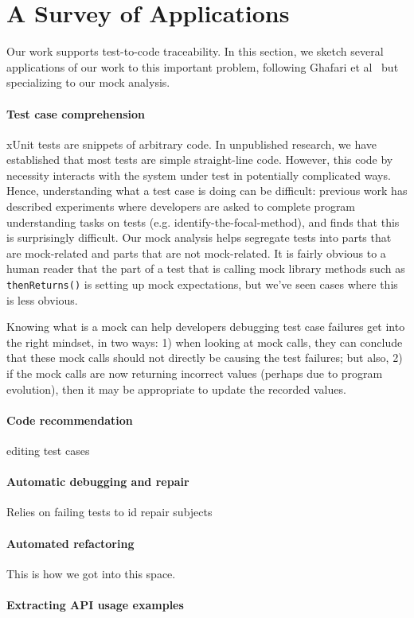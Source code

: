 \section{A Survey of Applications}
\label{sec:applications}

Our work supports test-to-code traceability. In this section, we
sketch several applications of our work to this important problem,
following Ghafari et al~\cite{ghafari15:_autom} but specializing to
our mock analysis.

\paragraph{Test case comprehension} xUnit tests are snippets of arbitrary
code. In unpublished research, we have established that most tests are
simple straight-line code. However, this code by necessity interacts
with the system under test in potentially complicated ways. Hence,
understanding what a test case is doing can be difficult: previous
work has described experiments where developers are asked to complete
program understanding tasks on tests (e.g. identify-the-focal-method),
and finds that this is surprisingly difficult. Our mock analysis helps
segregate tests into parts that are mock-related and parts that are
not mock-related.  It is fairly obvious to a human reader that the
part of a test that is calling mock library methods such as
\texttt{thenReturns()} is setting up mock expectations, but we've seen cases
where this is less obvious.

Knowing what is a mock can help developers debugging test case
failures get into the right mindset, in two ways: 1) when looking at
mock calls, they can conclude that these mock calls should not
directly be causing the test failures; but also, 2) if the mock calls
are now returning incorrect values (perhaps due to program evolution),
then it may be appropriate to update the recorded values.

\paragraph{Code recommendation}
editing test cases

\paragraph{Automatic debugging and repair}
Relies on failing tests to id repair subjects

\paragraph{Automated refactoring}
This is how we got into this space.

\paragraph{Extracting API usage examples}


